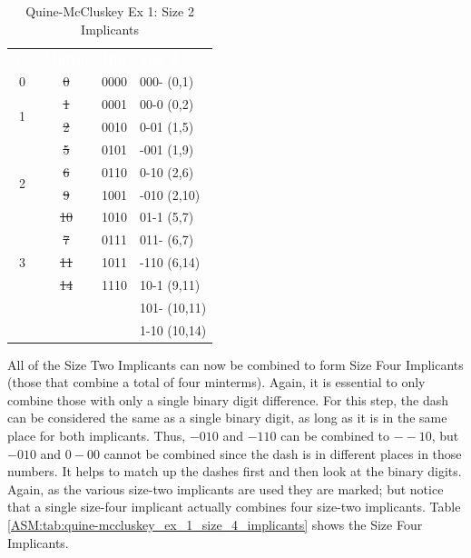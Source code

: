 \begin{table}[H]
	\sffamily
	\newcommand{\head}[1]{\textcolor{white}{\textbf{#1}}}		
	\begin{center}
		\begin{tabular}{ccc|l} 
			\rowcolor{black!75}
			\head{1's} & \head{Mntrm} 
				& \head{Bin} & \head{Size 2} \\
			                 0 & \sout{0} & 0000 & 000- (0,1) \\
			\cline{1-3}
			\multirow{2}{*}{1} & \sout{1}  & 0001 & 00-0 (0,2) \\
			                   & \sout{2}  & 0010 & 0-01 (1,5) \\
			\cline{1-3}
			\multirow{4}{*}{2} & \sout{5}  & 0101 & -001 (1,9) \\
			                   & \sout{6}  & 0110 & 0-10 (2,6) \\		
			                   & \sout{9}  & 1001 & -010 (2,10) \\		
			                   & \sout{10} & 1010 & 01-1 (5,7) \\
			\cline{1-3}
			\multirow{3}{*}{3} & \sout{7}  & 0111 & 011- (6,7) \\
			                   & \sout{11} & 1011 & -110 (6,14) \\		
			                   & \sout{14} & 1110 & 10-1 (9,11) \\
			\cline{1-3}
			                   &    &      & 101- (10,11) \\
			                   &    &      & 1-10 (10,14) \\
			\hline
		\end{tabular}
	\end{center}
	\caption{Quine-McCluskey Ex 1: Size 2 Implicants}
  \label{ASM:tab:quine-mccluskey_ex_1_size_2_implicants}
\end{table}

All of the Size Two Implicants can now be combined to form Size Four Implicants (those that combine a total of four minterms). Again, it is essential to only combine those with only a single binary digit difference. For this step, the dash can be considered the same as a single binary digit, as long as it is in the same place for both implicants. Thus, $ -010 $ and $ -110 $ can be combined to $ --10 $, but $ -010 $ and $ 0-00 $ cannot be combined since the dash is in different places in those numbers. It helps to match up the dashes first and then look at the binary digits. Again, as the various size-two implicants are used they are marked; but notice that a single size-four implicant actually combines four size-two implicants. Table \ref{ASM:tab:quine-mccluskey_ex_1_size_4_implicants} shows the Size Four Implicants.

